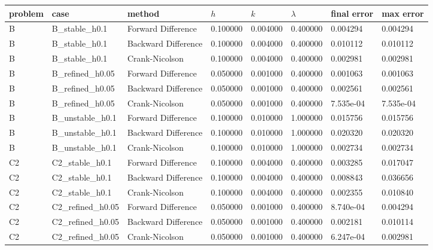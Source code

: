 \begin{tabular}{llllllll}
\toprule
problem & case & method & $h$ & $k$ & $\lambda$ & final error & max error \\
\midrule
B & B\_stable\_h0.1 & Forward Difference & 0.100000 & 0.004000 & 0.400000 & 0.004294 & 0.004294 \\
B & B\_stable\_h0.1 & Backward Difference & 0.100000 & 0.004000 & 0.400000 & 0.010112 & 0.010112 \\
B & B\_stable\_h0.1 & Crank-Nicolson & 0.100000 & 0.004000 & 0.400000 & 0.002981 & 0.002981 \\
B & B\_refined\_h0.05 & Forward Difference & 0.050000 & 0.001000 & 0.400000 & 0.001063 & 0.001063 \\
B & B\_refined\_h0.05 & Backward Difference & 0.050000 & 0.001000 & 0.400000 & 0.002561 & 0.002561 \\
B & B\_refined\_h0.05 & Crank-Nicolson & 0.050000 & 0.001000 & 0.400000 & 7.535e-04 & 7.535e-04 \\
B & B\_unstable\_h0.1 & Forward Difference & 0.100000 & 0.010000 & 1.000000 & 0.015756 & 0.015756 \\
B & B\_unstable\_h0.1 & Backward Difference & 0.100000 & 0.010000 & 1.000000 & 0.020320 & 0.020320 \\
B & B\_unstable\_h0.1 & Crank-Nicolson & 0.100000 & 0.010000 & 1.000000 & 0.002734 & 0.002734 \\
C2 & C2\_stable\_h0.1 & Forward Difference & 0.100000 & 0.004000 & 0.400000 & 0.003285 & 0.017047 \\
C2 & C2\_stable\_h0.1 & Backward Difference & 0.100000 & 0.004000 & 0.400000 & 0.008843 & 0.036656 \\
C2 & C2\_stable\_h0.1 & Crank-Nicolson & 0.100000 & 0.004000 & 0.400000 & 0.002355 & 0.010840 \\
C2 & C2\_refined\_h0.05 & Forward Difference & 0.050000 & 0.001000 & 0.400000 & 8.740e-04 & 0.004294 \\
C2 & C2\_refined\_h0.05 & Backward Difference & 0.050000 & 0.001000 & 0.400000 & 0.002181 & 0.010114 \\
C2 & C2\_refined\_h0.05 & Crank-Nicolson & 0.050000 & 0.001000 & 0.400000 & 6.247e-04 & 0.002981 \\
\bottomrule
\end{tabular}
